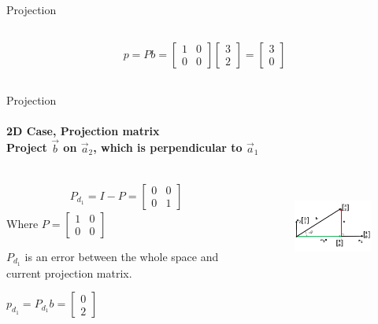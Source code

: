 \documentclass[aspectratio=169]{beamer}
\begin{document}
\begin{frame}[t]{Projection}
\begin{columns}[T,onlytextwidth]
\begin{column}{0.49\textwidth}
\begin{align*}
                p = Pb = \begin{bmatrix}1&0\\0&0\end{bmatrix}\begin{bmatrix}3\\2\end{bmatrix} = \begin{bmatrix}3\\0\end{bmatrix}
                \end{align*}
        \end{column}
    \end{columns}
\end{frame}

\begin{frame}[t]{Projection}
    \framesubtitle{2D Case, Projection matrix \\ Project $\vec{b}$ on $\vec{a}_2$, which is perpendicular to $\vec{a}_1$ }
    \vspace{-0.4cm}
    \begin{columns}[T,onlytextwidth]
        \begin{column}{0.49\textwidth}
            \begin{align*}
                P_{d_1} = I - P = \begin{bmatrix}0&0\\0&1\end{bmatrix}
                \end{align*}
                Where $P=\begin{bmatrix}1&0\\0&0\end{bmatrix}$
                
                $P_{d_1}$ is an error between the whole space and current projection matrix.
                
                $p_{d_1} = P_{d_1}b = \begin{bmatrix}0\\2\end{bmatrix}$
        \end{column}
        \begin{column}{0.49\textwidth}
            \begin{figure}[H]
                \centering\includegraphics[height=3cm,width=1\textwidth,keepaspectratio]{resources/fig2.png}
                \label{fig:resources/fig2.png}
            \end{figure}

        \end{column}
    \end{columns}
\end{frame}
\end{document}
